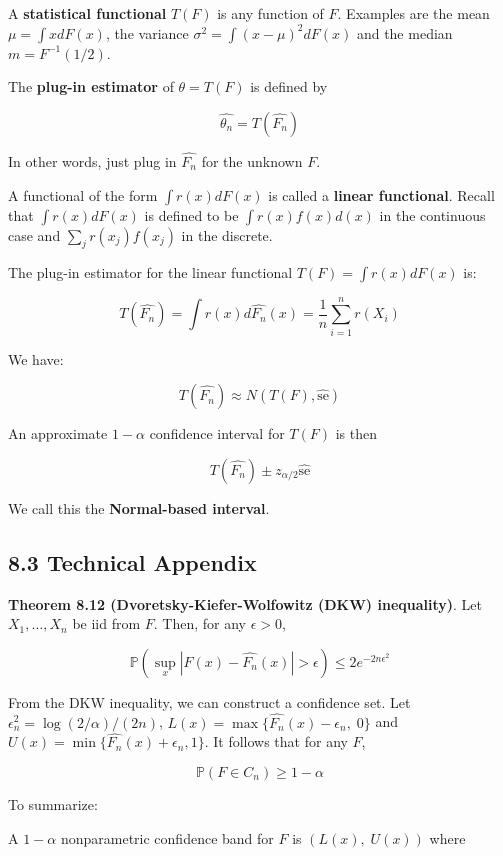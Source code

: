 A \textbf{statistical functional} \(T(F)\) is any function of \(F\).
Examples are the mean \(\mu = \int x dF(x)\), the variance
\(\sigma^{2} = \int (x - \mu)^{2} dF(x)\) and the median
\(m = F^{-1}(1/2)\).

The \textbf{plug-in estimator} of \(\theta = T(F)\) is defined by

\[\hat{\theta_{n}} = T(\hat{F_{n}}) \]

In other words, just plug in \(\hat{F_{n}}\) for the unknown \(F\).

A functional of the form \(\int r(x) dF(x)\) is called a \textbf{linear
functional}. Recall that \(\int r(x) dF(x)\) is defined to be
\(\int r(x) f(x) d(x)\) in the continuous case and
\(\sum_{j} r(x_{j}) f(x_{j})\) in the discrete.

The plug-in estimator for the linear functional
\(T(F) = \int r(x) dF(x)\) is:

\[T(\hat{F_{n}}) = \int r(x) d\hat{F_{n}}(x) = \frac{1}{n} \sum_{i=1}^{n} r(X_{i})\]

We have:

\[ T(\hat{F_{n}}) \approx N\left(T(F), \hat{\text{se}}\right) \]

An approximate \(1 - \alpha\) confidence interval for \(T(F)\) is then

\[ T(\hat{F_{n}}) \pm z_{\alpha/2} \hat{\text{se}} \]

We call this the \textbf{Normal-based interval}.

\subsection*{8.3 Technical Appendix}

\textbf{Theorem 8.12 (Dvoretsky-Kiefer-Wolfowitz (DKW) inequality)}. Let
\(X_{1}, \dots, X_{n}\) be iid from \(F\). Then, for any \(\epsilon > 0\),

\[\mathbb{P}\left( \sup_x |F(x) - \hat{F_{n}}(x) | > \epsilon \right) \leq 2 e^{-2n\epsilon^{2}}\]

From the DKW inequality, we can construct a confidence set. Let
\(\epsilon_{n}^{2} = \log(2/\alpha) / (2n)\),
\(L(x) = \max \{ \hat{F_{n}}(x) - \epsilon_{n}, \; 0 \}\) and
\(U(x) = \min \{\hat{F_{n}}(x) + \epsilon_{n}, 1 \}\). It follows that for
any \(F\),

\[ \mathbb{P}(F \in C_{n}) \geq 1 - \alpha \]

To summarize:

A \(1 - \alpha\) nonparametric confidence band for \(F\) is
\((L(x), \; U(x))\) where

